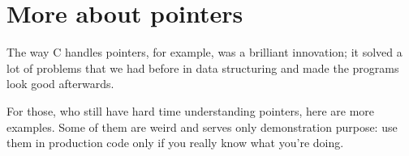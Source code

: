 \chapter{More about pointers}
\myindex{\CLanguageElements!\Pointers}
\label{label_pointers}

\epigraph{The way C handles pointers, for example, was a brilliant innovation;
it solved a lot of problems that we had before in data structuring and
made the programs look good afterwards.}
{}

For those, who still have hard time understanding \CCpp pointers, here are more examples.
Some of them are weird and serves only demonstration purpose:
use them in production code only if you really know what you're doing.







